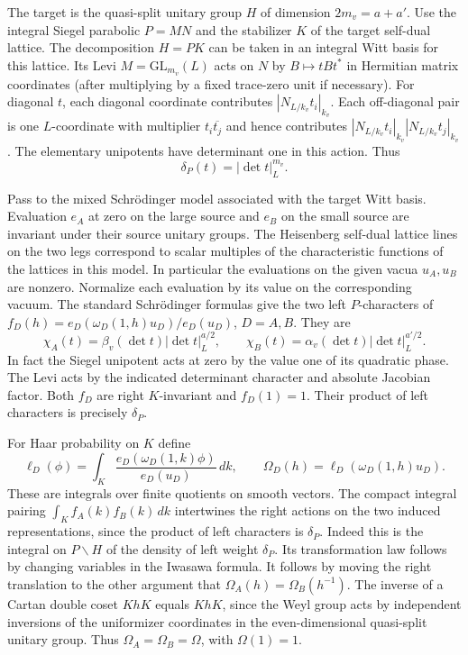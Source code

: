 The target is the quasi-split unitary group \(H\) of
dimension \(2m_v=a+a'\). Use the integral Siegel parabolic
\(P=MN\) and the stabilizer \(K\) of the target self-dual
lattice. The decomposition \(H=PK\) can be taken in an
integral Witt basis for this lattice. Its Levi
\(M=\mathrm{GL}_{m_v}(L)\) acts on \(N\) by
\(B\mapsto tBt^*\) in Hermitian matrix coordinates
(after multiplying by a fixed trace-zero unit if
necessary). For diagonal \(t\), each diagonal coordinate
contributes \(|N_{L/k_v} t_i|_{k_v}\).
Each off-diagonal pair is one \(L\)-coordinate with
multiplier \(t_i\overline{t_j}\) and hence contributes
\(|N_{L/k_v} t_i|_{k_v}|N_{L/k_v} t_j|_{k_v}\).
The elementary unipotents have determinant one in this
action. Thus
\[
 \delta_P(t)=|\det t|_L^{m_v}.
\]

Pass to the mixed Schr\"odinger model associated with
the target Witt basis. Evaluation \(e_A\) at zero
on the large source and \(e_B\) on the small source
are invariant under their source unitary groups.
The Heisenberg self-dual lattice lines on the two legs
correspond to scalar multiples of the characteristic
functions of the lattices in this model. In particular
the evaluations on the given vacua \(u_A,u_B\) are
nonzero. Normalize each evaluation by its value on
the corresponding vacuum. The standard Schr\"odinger
formulas give the two left \(P\)-characters of
\(f_D(h)=e_D(\omega_D(1,h)u_D)/e_D(u_D)\), \(D=A,B\).
They are
\[
 \chi_A(t)=\beta_v(\det t)|\det t|_L^{a/2},\qquad
 \chi_B(t)=\alpha_v(\det t)|\det t|_L^{a'/2}.
\]
In fact the Siegel unipotent acts at zero by the
value one of its quadratic phase. The Levi acts by
the indicated determinant character and absolute
Jacobian factor. Both \(f_D\) are right \(K\)-invariant
and \(f_D(1)=1\). Their product of left characters
is precisely \(\delta_P\).

For Haar probability on \(K\) define
\[
 \ell_D(\phi)
  =\int_K\frac{e_D(\omega_D(1,k)\phi)}{e_D(u_D)}\,dk,\qquad
 \Omega_D(h)=\ell_D(\omega_D(1,h)u_D).
\]
These are integrals over finite quotients on smooth
vectors. The compact integral pairing
\(\int_K f_A(k)f_B(k)\,dk\) intertwines the right
actions on the two induced representations, since the
product of left characters is \(\delta_P\).
Indeed this is the integral on \(P\backslash H\) of
the density of left weight \(\delta_P\).
Its transformation law follows by changing variables
in the Iwasawa formula. It follows by moving the
right translation to the other argument that
\(\Omega_A(h)=\Omega_B(h^{-1})\).
The inverse of a Cartan double coset \(KhK\) equals
\(KhK\), since the Weyl group acts by independent
inversions of the uniformizer coordinates in the
even-dimensional quasi-split unitary group.
Thus \(\Omega_A=\Omega_B=\Omega\), with \(\Omega(1)=1\).

